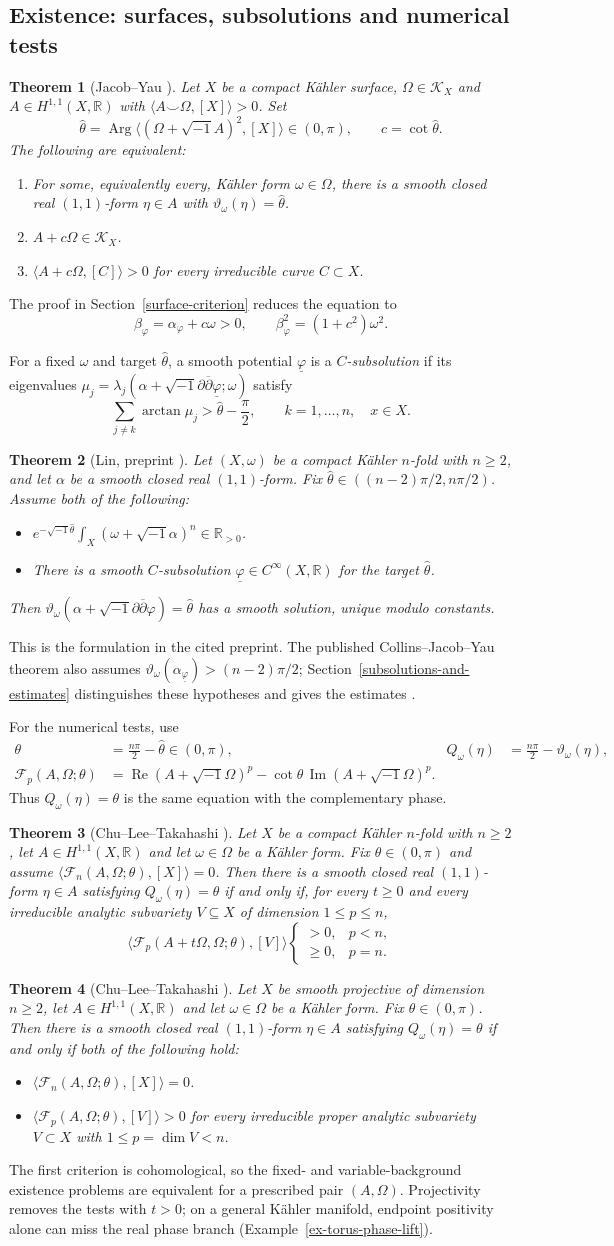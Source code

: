 \documentclass[12pt,reqno]{amsart}
\numberwithin{equation}{section}
\theoremstyle{plain}
\newtheorem{theorem}{Theorem}[section]
\theoremstyle{definition}
\newcommand{\ddbar}{\sqrt{-1}\partial\overline{\partial}}
\newcommand{\cK}{\mathcal K}
\newcommand{\cF}{\mathcal F}
\newcommand{\R}{\mathbb R}
\newcommand{\SurfaceCriterionStatement}{%
Let $X$ be a compact K\"ahler surface, $\Omega\in\cK_X$ and
$A\in H^{1,1}(X,\R)$ with $\langle A\smile\Omega,[X]\rangle>0$.
Set
\[
 \widehat\theta=\operatorname{Arg}\langle(\Omega+\sqrt{-1}A)^2,[X]\rangle
 \in(0,\pi),\qquad c=\cot\widehat\theta.
\]
The following are equivalent:
\begin{enumerate}
\item For some, equivalently every, K\"ahler form $\omega\in\Omega$,
there is a smooth closed real $(1,1)$-form $\eta\in A$ with
$\vartheta_\omega(\eta)=\widehat\theta$.
\item $A+c\Omega\in\cK_X$.
\item $\langle A+c\Omega,[C]\rangle>0$ for every irreducible curve
$C\subset X$.
\end{enumerate}
}
\newcommand{\SubsolutionStatement}{%
Let $(X,\omega)$ be a compact K\"ahler $n$-fold with $n\geq2$, and
let $\alpha$ be a smooth closed real $(1,1)$-form. Fix
$\widehat\theta\in((n-2)\pi/2,n\pi/2)$. Assume both of the following:
\begin{itemize}
\item $e^{-\sqrt{-1}\widehat\theta}\int_X(\omega+\sqrt{-1}\alpha)^n
\in\R_{>0}$.
\item There is a smooth $C$-subsolution
$\underline\varphi\in C^\infty(X,\R)$ for the target $\widehat\theta$.
\end{itemize}
Then $\vartheta_\omega(\alpha+\ddbar\varphi)=\widehat\theta$ has a
smooth solution, unique modulo constants.
}
\newcommand{\RayCriterionStatement}{%
Let $X$ be a compact K\"ahler $n$-fold with $n\geq2$, let
$A\in H^{1,1}(X,\R)$ and let $\omega\in\Omega$ be a K\"ahler form.
Fix $\theta\in(0,\pi)$ and assume
$\langle\cF_n(A,\Omega;\theta),[X]\rangle=0$.
Then there is a smooth closed real $(1,1)$-form $\eta\in A$ satisfying
$Q_\omega(\eta)=\theta$ if and only if, for every $t\geq0$ and every
irreducible analytic subvariety
$V\subseteq X$ of dimension $1\leq p\leq n$,
\[
 \big\langle\cF_p(A+t\Omega,\Omega;\theta),[V]\big\rangle
 \begin{cases}
 >0,&p<n,\\
 \geq0,&p=n.
 \end{cases}
\]
}
\newcommand{\ProjectiveCriterionStatement}{%
Let $X$ be smooth projective of dimension $n\geq2$, let
$A\in H^{1,1}(X,\R)$ and let $\omega\in\Omega$ be a K\"ahler form.
Fix $\theta\in(0,\pi)$.
Then there is a smooth closed real $(1,1)$-form $\eta\in A$ satisfying
$Q_\omega(\eta)=\theta$ if and only if both of the following hold:
\begin{itemize}
\item $\langle\cF_n(A,\Omega;\theta),[X]\rangle=0$.
\item $\langle\cF_p(A,\Omega;\theta),[V]\rangle>0$ for every irreducible
proper analytic subvariety $V\subset X$ with $1\leq p=\dim V<n$.
\end{itemize}
}
\begin{document}
\subsection{Existence: surfaces, subsolutions and numerical tests}
\label{intro-existence-results}
\begin{theorem}[Jacob--Yau {\cite[Theorem 1.2]{JY17}}]
\label{thm-surface-criterion}
\SurfaceCriterionStatement
\end{theorem}
The proof in Section~\ref{surface-criterion} reduces the equation to
\[
 \beta_\varphi=\alpha_\varphi+c\omega>0,\qquad
 \beta_\varphi^2=(1+c^2)\omega^2.
\]

For a fixed $\omega$ and target $\widehat\theta$, a smooth potential
$\underline\varphi$ is a \emph{$C$-subsolution} if its eigenvalues
$\mu_j=\lambda_j(\alpha+\ddbar\underline\varphi;\omega)$ satisfy
\begin{equation}\label{intro-subsolution-inequality}
 \sum_{j\ne k}\arctan\mu_j>\widehat\theta-\frac\pi2,
 \qquad k=1,\ldots,n,\quad x\in X.
\end{equation}
\begin{theorem}[Lin, preprint {\cite[Theorem 1.5]{Lin23}}]
\label{thm-subsolution-existence}
\SubsolutionStatement
\end{theorem}
This is the formulation in the cited preprint. The published
Collins--Jacob--Yau theorem also assumes
$\vartheta_\omega(\alpha_{\underline\varphi})>(n-2)\pi/2$;
Section~\ref{subsolutions-and-estimates} distinguishes these hypotheses
and gives the estimates \cite[Theorem 1.2]{CJY20}.

For the numerical tests, use
\begin{align}
 \theta&=\frac{n\pi}{2}-\widehat\theta\in(0,\pi),&
 Q_\omega(\eta)&=\frac{n\pi}{2}-\vartheta_\omega(\eta),
 \label{intro-complementary-phase}\\
 \cF_p(A,\Omega;\theta)
 &=\operatorname{Re}(A+\sqrt{-1}\Omega)^p
   -\cot\theta\,\operatorname{Im}(A+\sqrt{-1}\Omega)^p.
 \label{intro-numerical-forms}
\end{align}
Thus $Q_\omega(\eta)=\theta$ is the same equation with the complementary
phase.

\begin{theorem}[Chu--Lee--Takahashi {\cite[Theorem 1.3]{CLT24}}]
\label{thm-ray-criterion}
\RayCriterionStatement
\end{theorem}

\begin{theorem}[Chu--Lee--Takahashi {\cite[Corollary 1.5]{CLT24}}]
\label{thm-projective-criterion}
\ProjectiveCriterionStatement
\end{theorem}
The first criterion is cohomological, so the fixed- and variable-background
existence problems are equivalent for a prescribed pair $(A,\Omega)$.
Projectivity removes the tests with $t>0$; on a general K\"ahler manifold,
endpoint positivity alone can miss the real phase branch
(Example~\ref{ex-torus-phase-lift}).
\end{document}
